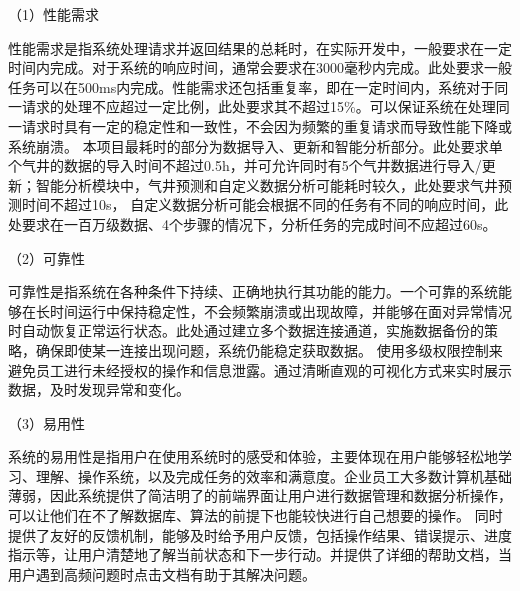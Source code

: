 （1）性能需求

性能需求是指系统处理请求并返回结果的总耗时，在实际开发中，一般要求在一定时间内完成。对于系统的响应时间，通常会要求在3000毫秒内完成。此处要求一般任务可以在500ms内完成。性能需求还包括重复率，即在一定时间内，系统对于同一请求的处理不应超过一定比例，此处要求其不超过15\%。可以保证系统在处理同一请求时具有一定的稳定性和一致性，不会因为频繁的重复请求而导致性能下降或系统崩溃。
本项目最耗时的部分为数据导入、更新和智能分析部分。此处要求单个气井的数据的导入时间不超过0.5h，并可允许同时有5个气井数据进行导入/更新；智能分析模块中，气井预测和自定义数据分析可能耗时较久，此处要求气井预测时间不超过10s，
自定义数据分析可能会根据不同的任务有不同的响应时间，此处要求在一百万级数据、4个步骤的情况下，分析任务的完成时间不应超过60s。

（2）可靠性

可靠性是指系统在各种条件下持续、正确地执行其功能的能力。一个可靠的系统能够在长时间运行中保持稳定性，不会频繁崩溃或出现故障，并能够在面对异常情况时自动恢复正常运行状态。此处通过建立多个数据连接通道，实施数据备份的策略，确保即使某一连接出现问题，系统仍能稳定获取数据。
使用多级权限控制来避免员工进行未经授权的操作和信息泄露。通过清晰直观的可视化方式来实时展示数据，及时发现异常和变化。

（3）易用性

系统的易用性是指用户在使用系统时的感受和体验，主要体现在用户能够轻松地学习、理解、操作系统，以及完成任务的效率和满意度。企业员工大多数计算机基础薄弱，因此系统提供了简洁明了的前端界面让用户进行数据管理和数据分析操作，可以让他们在不了解数据库、算法的前提下也能较快进行自己想要的操作。
同时提供了友好的反馈机制，能够及时给予用户反馈，包括操作结果、错误提示、进度指示等，让用户清楚地了解当前状态和下一步行动。并提供了详细的帮助文档，当用户遇到高频问题时点击文档有助于其解决问题。
